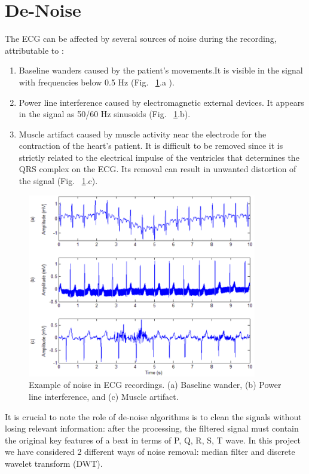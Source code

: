 \documentclass[LaM,binding=0.6cm]{sapthesis}
\begin{document}
\section{De-Noise}
The ECG  can be affected by several sources of noise during the recording, attributable to : 
\begin{enumerate}
\item Baseline wanders caused by the patient's movements.It is visible in the signal with frequencies below 0.5 Hz (Fig. ~\ref{fig:n1}.a ).
\item Power line interference caused by electromagnetic external devices. It appears in the signal as 50/60 Hz sinusoids (Fig. ~\ref{fig:n1}.b).
\item Muscle artifact caused by muscle activity near the electrode for the contraction of the heart's patient. It is difficult to be removed since it is strictly related to the electrical impulse of the ventricles that determines the QRS complex on the ECG. Its removal can result in unwanted distortion of the signal (Fig. ~\ref{fig:n1}.c).
\end{enumerate}
\begin{figure}  \centering
    \includegraphics[width=100mm,scale=0.7]{noise.png}
    \caption{Example of noise in ECG recordings. (a) Baseline wander, (b) Power line interference, and (c) Muscle artifact. \cite{noise}}
    \label{fig:n1}
\end{figure}
It is crucial to note the role of de-noise algorithms is to clean the signals without losing relevant information:  after the processing, the filtered signal must contain the original key features of a beat in terms of P, Q, R, S, T wave. In this project we have considered 2 different ways of noise removal: median filter and discrete wavelet transform (DWT).
\end{document}
